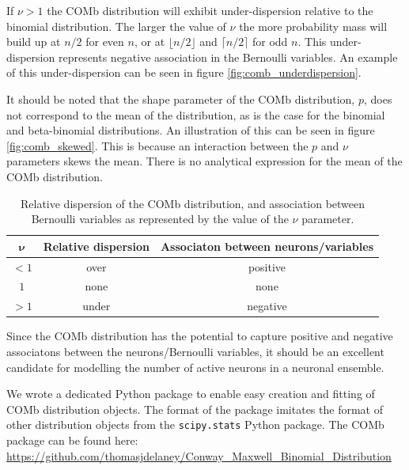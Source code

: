 \documentclass[a4paper,12pt]{article}
\theoremstyle{definition}
\begin{document}
      If $\nu > 1$ the COMb distribution will exhibit under-dispersion relative to the binomial distribution. The larger the value of $\nu$ the more probability mass will build up at $n/2$ for even $n$, or at $\lfloor n/2 \rfloor$ and $\lceil n/2 \rceil$ for odd $n$. This under-dispersion represents negative association in the Bernoulli variables. An example of this under-dispersion can be seen in figure \ref{fig:comb_underdispersion}.

      It should be noted that the shape parameter of the COMb distribution, $p$, does not correspond to the mean of the distribution, as is the case for the binomial and beta-binomial distributions. An illustration of this can be seen in figure \ref{fig:comb_skewed}. This is because an interaction between the $p$ and $\nu$ parameters skews the mean. There is no analytical expression for the mean of the COMb distribution.

      \begin{table}
        \centering
        \begin{tabular}[h]{|c|c|c|}
          \hline
          $\boldsymbol{\nu}$  & \textbf{Relative dispersion}  & \textbf{Associaton between neurons/variables} \\ \hline
          $<1$                & over                          & positive                                      \\ \hline
          $1$                 & none                          & none                                          \\ \hline
          $>1$                & under                         & negative                                      \\ \hline
        \end{tabular}
        \caption{Relative dispersion of the COMb distribution, and association between Bernoulli variables as represented by the value of the $\nu$ parameter.}
      \end{table}


      Since the COMb distribution has the potential to capture positive and negative associatons between the neurons/Bernoulli variables, it should be an excellent candidate for modelling the number of active neurons in a neuronal ensemble.

      We wrote a dedicated Python package to enable easy creation and fitting of COMb distribution objects. The format of the package imitates the format of other distribution objects from the \texttt{scipy.stats} Python package. The COMb package can be found here: \\
      \url{https://github.com/thomasjdelaney/Conway_Maxwell_Binomial_Distribution}
\end{document}
